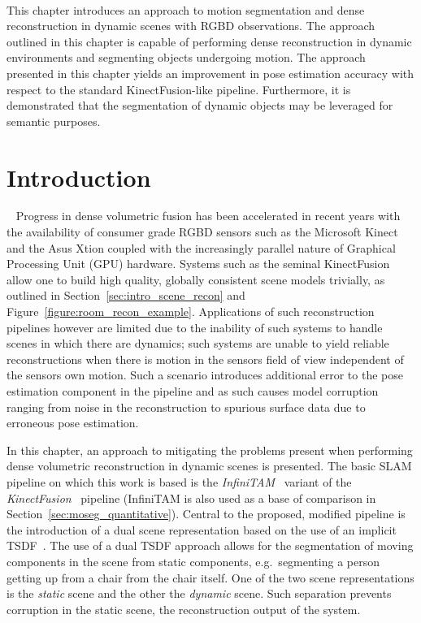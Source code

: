 ~\label{chap:moseg}
\begin{chapterabstract}
This chapter introduces an approach to motion segmentation and dense reconstruction 
in dynamic scenes with RGBD observations. The approach outlined in this chapter is 
capable of performing dense reconstruction in dynamic environments and segmenting objects 
undergoing motion. The approach presented in this chapter yields an improvement in pose 
estimation accuracy with respect to the standard KinectFusion-like pipeline. Furthermore, 
it is demonstrated that the segmentation of dynamic objects may be leveraged for semantic 
purposes.
\end{chapterabstract}

\section{Introduction}
~\label{sec:moseg_introduction}
Progress in dense volumetric fusion has been accelerated in recent years with
the availability of consumer grade RGBD sensors such as the Microsoft Kinect and
the Asus Xtion coupled with the increasingly parallel nature of Graphical Processing 
Unit (GPU) hardware. Systems such as the seminal KinectFusion~\cite{Newcombe2011} 
allow one to build high quality, globally consistent scene models trivially, as 
outlined in Section~\ref{sec:intro_scene_recon} and Figure~\ref{figure:room_recon_example}.
Applications of such reconstruction pipelines however are limited due to the 
inability of such systems to handle scenes in which there are dynamics; such 
systems are unable to yield reliable reconstructions when there is motion in the 
sensors field of view independent of the sensors own motion. Such a scenario introduces
additional error to the pose estimation component in the pipeline and as such
causes model corruption ranging from noise in the reconstruction to spurious 
surface data due to erroneous pose estimation.

In this chapter, an approach to mitigating the problems present when performing 
dense volumetric reconstruction in dynamic scenes is presented. The basic SLAM 
pipeline on which this work is based is the \textit{InfiniTAM}~\cite{Prisacariu2014} 
variant of the \textit{KinectFusion}~\cite{Newcombe2011} pipeline (InfiniTAM is also used 
as a base of comparison in Section~\ref{sec:moseg_quantitative}). Central to the
proposed, modified pipeline is the introduction of a dual scene representation based on 
the use of an implicit TSDF~\cite{Curless1996}. The use of a dual TSDF approach allows
for the segmentation of moving components in the scene from static components,
e.g.\ segmenting a person getting up from a chair from the chair itself. One of
the two scene representations is the \textit{static} scene and the other the
\textit{dynamic} scene. Such separation prevents corruption in the static scene,
the reconstruction output of the system.

